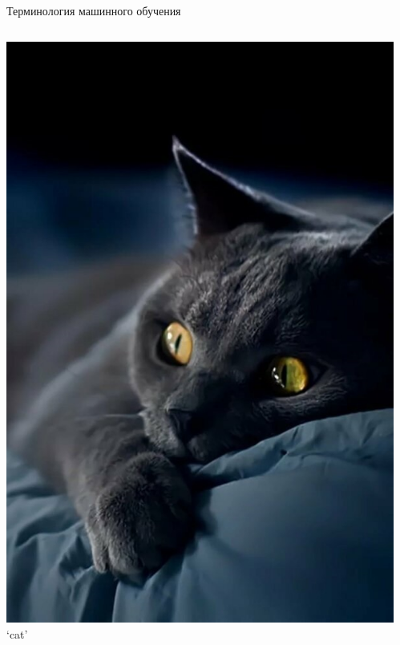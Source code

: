 \documentclass[aspectratio=169, professionalfonts]{beamer}
\begin{document}
\begin{frame}{Терминология машинного обучения}
\begin{columns}
\begin{column}{.1\linewidth}
            \includegraphics[width=\linewidth]{graphs/fig17_4.jpg}
            `cat'
        \end{column}
        \begin{column}{.1\linewidth}
            \centering

\end{column}
\end{columns}
\end{frame}
\end{document}
